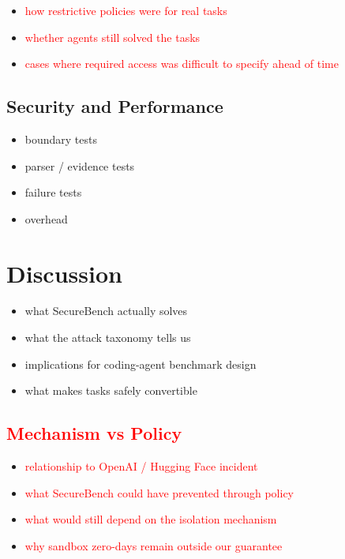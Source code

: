 \documentclass[conference]{IEEEtran}
\newcommand{\draft}[1]{%
    \par\noindent
    {\color{gray}\small #1}
    \par
}
\newcommand{\teacher}[1]{\textcolor{red}{#1}}
\begin{document}
\draft{
\begin{itemize}
    \item \teacher{how restrictive policies were for real tasks}
    \item \teacher{whether agents still solved the tasks}
    \item \teacher{cases where required access was difficult to specify ahead of time}
\end{itemize}
}

\subsection{Security and Performance}

\draft{
\begin{itemize}
    \item boundary tests
    \item parser / evidence tests
    \item failure tests
    \item overhead
\end{itemize}
}



\section{Discussion}

\draft{
\begin{itemize}
    \item what SecureBench actually solves
    \item what the attack taxonomy tells us
    \item implications for coding-agent benchmark design
    \item what makes tasks safely convertible
\end{itemize}
}

\subsection{\teacher{Mechanism vs Policy}}

\draft{
\begin{itemize}
    \item \teacher{relationship to OpenAI / Hugging Face incident}
    \item \teacher{what SecureBench could have prevented through policy}
    \item \teacher{what would still depend on the isolation mechanism}
    \item \teacher{why sandbox zero-days remain outside our guarantee}
\end{itemize}
}
\end{document}

